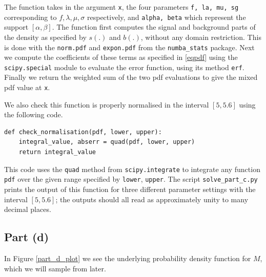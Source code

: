 \documentclass[12pt]{article}
\begin{document}
The function takes in the argument \texttt{x}, the four parameters \texttt{f, la, mu, sg} corresponding to $f, \lambda, \mu, \sigma$ respectively, and \texttt{alpha, beta} which represent the support $[\alpha,\beta]$.
The function first computes the signal and background parts of the density as specified by $s(.)$ and $b(.)$, without any domain restriction.
This is done with the \texttt{norm.pdf} and \texttt{expon.pdf} from the \texttt{numba\_stats} package.
Next we compute the coefficients of these terms as specified in \eqref{eqpdf} using the \texttt{scipy.special} module to evaluate the error function, using its method \texttt{erf}.
Finally we return the weighted sum of the two pdf evaluations to give the mixed pdf value at \texttt{x}.

We also check this function is properly normalised in the interval $[5, 5.6]$ using the following code.

\begin{lstlisting}[caption=Function checking the normalisation of the pdf for part (c).]
def check_normalisation(pdf, lower, upper):
    integral_value, abserr = quad(pdf, lower, upper)
    return integral_value
\end{lstlisting}

This code uses the \texttt{quad} method from \texttt{scipy.integrate} to integrate any function \texttt{pdf} over the given range specified by \texttt{lower}, \texttt{upper}.
The script \texttt{solve\_part\_c.py} prints the output of this function for three different parameter settings with the interval $[5, 5.6]$; the outputs should all read as approximately unity to many decimal places.

\subsection*{Part (d)}

In Figure \ref{part_d_plot} we see the underlying probability density function for $M$, which we will sample from later.
\end{document}

